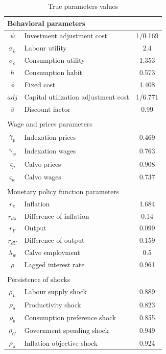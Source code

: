 \documentclass{pracamgr}
\numberwithin{equation}{section}
\begin{document}
\begin{table}[H]
\centering
\caption[True parameters values]{True parameters values}
    \label{True_par_values}
\small{
\begin{tabular}{@{}| c | l | c |@{}}
\multicolumn{3}{l}{Behavioral parameters} \\
\midrule
$\psi$ & Investment adjustment cost & 1/0.169 \\
$\sigma_L$ & Labour utility & 2.4 \\
$\sigma_c$ & Consumption utility & 1.353 \\
$h$ & Consumption habit & 0.573 \\
$\phi$ & Fixed cost & 1.408 \\
$adj$ & Capital utilization adjustment cost & 1/6.771 \\
$\beta$ & Discount factor & 0.99 \\
\midrule
\multicolumn{3}{l}{}  \\
\multicolumn{3}{l}{Wage and prices parameters}\\
\midrule
$\gamma_p$ & Indexation prices & 0.469 \\
$\gamma_w$ & Indexation wages & 0.763 \\
$\varsigma_{p}$ & Calvo prices & 0.908 \\
$\varsigma_{w}$ & Calvo wages & 0.737 \\
\midrule
\multicolumn{3}{l}{}  \\
\multicolumn{3}{l}{Monetary policy function parameters} \\
\midrule
$r_\pi$ & Inflation & 1.684 \\
$r_{d\pi}$ & Difference of inflation & 0.14 \\
$r_Y$ & Output & 0.099 \\
$r_{dY} $ & Difference of output & 0.159 \\
$\lambda_w$ & Calvo employment & 0.5 \\
$\rho$ & Lagged interest rate & 0.961 \\
\midrule
\multicolumn{3}{l}{}  \\
\multicolumn{3}{l}{Persistence of shocks} \\
\midrule
$\rho_L$ & Labour supply shock & 0.889 \\
$\rho_a$ & Productivity shock & 0.823 \\
$\rho_b$ & Consumption preference shock & 0.855 \\
$\rho_G$ & Government spending shock & 0.949 \\
$\rho_\pi$ & Inflation objective shock & 0.924 \\

\end{tabular}}
\end{table}
\end{document}
